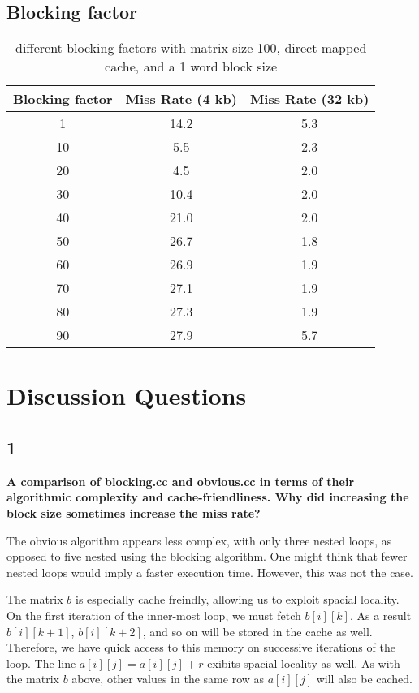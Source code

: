 \documentclass[letterpaper, 12pt, oneside]{memoir}
\begin{document}
\subsection{Blocking factor}

\begin{table}[H]
\centering
\begin{tabular}{c|c|c}
    Blocking factor & Miss Rate (4 kb) & Miss Rate (32 kb) \\ \hline
    1   & 14.2  & 5.3 \\
    10  & 5.5   & 2.3 \\
    20  & 4.5   & 2.0 \\
    30  & 10.4  & 2.0 \\
    40  & 21.0  & 2.0 \\
    50  & 26.7  & 1.8 \\
    60  & 26.9  & 1.9 \\
    70  & 27.1  & 1.9 \\
    80  & 27.3  & 1.9 \\
    90  & 27.9  & 5.7 \\
\end{tabular}
\caption{different blocking factors with matrix size 100, direct mapped cache, and a 1 word block size}
\end{table}

\section{Discussion Questions}


\subsection{1}
\textbf{A comparison of blocking.cc and obvious.cc in terms of their algorithmic 
complexity and cache-friendliness. Why did increasing the block size sometimes 
increase the miss rate?}

The obvious algorithm appears less complex, with only three nested loops, as
opposed to five nested using the blocking algorithm. One might think that
fewer nested loops would imply a faster execution time. However, this was
not the case.

The matrix $b$ is especially cache freindly, allowing us to exploit spacial
locality. On the first iteration of the inner-most loop, we must fetch
$b[i][k]$. As a result $b[i][k+1]$, $b[i][k+2]$, and so on will be stored in 
the cache as well. Therefore, we have quick access to this memory on successive
iterations of the loop. The line $ a[i][j] = a[i][j] + r$  exibits spacial
locality as well. As with the matrix $b$ above, other values in the same row 
as $a[i][j]$ will also be cached. 
\end{document}
